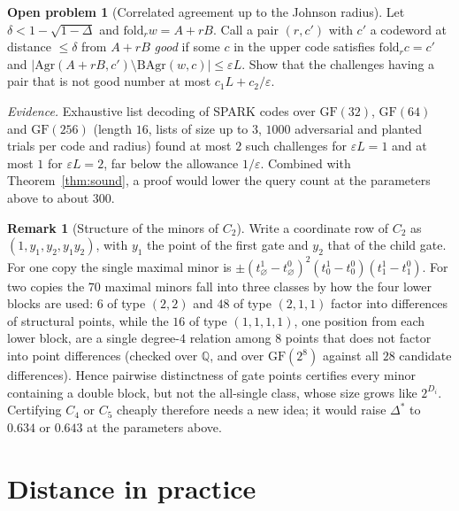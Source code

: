 \documentclass[11pt]{article}
\theoremstyle{definition}
\newtheorem{remark}[theorem]{Remark}
\newtheorem{problem}[theorem]{Open problem}
\newcommand{\fold}{\mathrm{fold}}
\begin{document}
\begin{problem}[Correlated agreement up to the Johnson radius]\label{prob:johnson}
Let $\delta<1-\sqrt{1-\Delta}$ and $\fold_rw=A+rB$. Call a pair $(r,c')$ with $c'$ a codeword at distance
$\le\delta$ from $A+rB$ \emph{good} if some $c$ in the upper code satisfies $\fold_rc=c'$ and
$|\mathrm{Agr}(A+rB,c')\setminus\mathrm{BAgr}(w,c)|\le\varepsilon L$. Show that the challenges having a pair that is
not good number at most $c_1L+c_2/\varepsilon$.

\emph{Evidence.} Exhaustive list decoding of SPARK codes over $\mathrm{GF}(32)$, $\mathrm{GF}(64)$ and
$\mathrm{GF}(256)$ (length $16$, lists of size up to $3$, $1000$ adversarial and planted trials per code and radius)
found at most $2$ such challenges for $\varepsilon L=1$ and at most $1$ for $\varepsilon L=2$, far below the
allowance $1/\varepsilon$. Combined with Theorem~\ref{thm:sound}, a proof would lower the query count at the
parameters above to about $300$.
\end{problem}

\begin{remark}[Structure of the minors of $C_2$]
Write a coordinate row of $C_2$ as $(1,y_1,y_2,y_1y_2)$, with $y_1$ the point of the first gate and $y_2$
that of the child gate. For one copy the single maximal minor is
$\pm(t^1_\varnothing-t^0_\varnothing)^2(t^1_0-t^0_0)(t^1_1-t^0_1)$. For two copies the $70$ maximal minors fall
into three classes by how the four lower blocks are used: $6$ of type $(2,2)$ and $48$ of type $(2,1,1)$
factor into differences of structural points, while the $16$ of type $(1,1,1,1)$, one position from each
lower block, are a single degree-$4$ relation among $8$ points that does not factor into point differences
(checked over $\mathbb Q$, and over $\mathrm{GF}(2^8)$ against all $28$ candidate differences). Hence
pairwise distinctness of gate points certifies every minor containing a double block, but not the
all-single class, whose size grows like $2^{D_i}$. Certifying $C_4$ or $C_5$ cheaply therefore needs a new
idea; it would raise $\Delta^{*}$ to $0.634$ or $0.643$ at the parameters above.
\end{remark}

\section{Distance in practice}\label{sec:practice}
\end{document}
